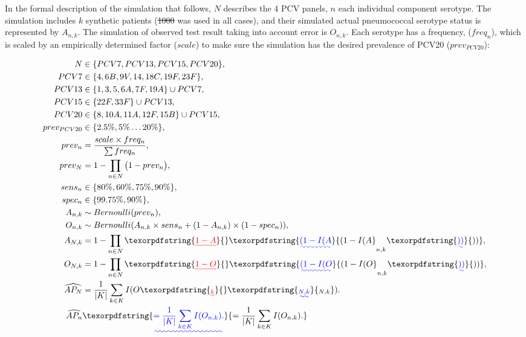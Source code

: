 \documentclass[a4paper, 12pt, twoside]{article}
\providecommand{\DIFaddtex}[1]{{\protect\color{blue}\uwave{#1}}} %
\providecommand{\DIFdeltex}[1]{{\protect\color{red}\sout{#1}}}                      %
\providecommand{\DIFaddbegin}{} %
\providecommand{\DIFaddend}{} %
\providecommand{\DIFdelbegin}{} %
\providecommand{\DIFdelend}{} %
\providecommand{\DIFadd}[1]{\texorpdfstring{\DIFaddtex{#1}}{#1}} %
\providecommand{\DIFdel}[1]{\texorpdfstring{\DIFdeltex{#1}}{}} %
\begin{document}
In the formal description of the simulation that follows, \(N\) describes the 4 PCV panels, \(n\) each individual component serotype. The simulation includes \DIFdelbegin \DIFdel{\(k\) }\DIFdelend \DIFaddbegin \DIFadd{a set of \(K\) }\DIFaddend synthetic patients (\DIFdelbegin \DIFdel{1000 }\DIFdelend \DIFaddbegin \DIFadd{4000 }\DIFaddend was used in all cases\DIFaddbegin \DIFadd{, indexed by \(k\)}\DIFaddend ), and their simulated actual pneumococcal serotype status is represented by \(A_{n,k}\). The simulation of observed test result taking into account error is \(O_{n,k}\). Each serotype has a frequency, (\(freq_n\)), which is scaled by an empirically determined factor (\(scale\)) to make sure the simulation has the desired prevalence of PCV20 (\(prev_{PCV20}\)):

\begin{equation*}
\begin{aligned}
N &\in \{PCV7, PCV13, PCV15, PCV20\}, \\
PCV7 &\in \{4, 6B, 9V, 14, 18C, 19F, 23F\}, \\
PCV13 &\in \{1, 3, 5, 6A, 7F, 19A\} \cup PCV7, \\
PCV15 &\in \{22F, 33F\} \cup PCV13,\\
PCV20 &\in \{8, 10A, 11A, 12F, 15B\} \cup PCV15,\\
prev_{PCV20} &\in \{2.5\%, 5\% \dots 20\% \},  \\
prev_n &= \frac{scale \times freq_n}{\sum{freq_n}}, \\
prev_N &= 1-\prod_{n \in N}{\DIFaddbegin \big(\DIFaddend 1-prev_n}\DIFaddbegin \big)\DIFaddend , \\
sens_n &\in \{80\%, 60\%, 75\%, 90\% \},  \\
spec_n &\in \{99.75\%,90\% \}, \\
A_{n,k} &\sim Bernoulli(prev_n), \\
O_{n,k} &\sim Bernoulli(A_{n,k} \times sens_n + (1-A_{n,k}) \times (1-spec_n)), \\
A_{N,k} &= 1-\prod_{n \in N}{\DIFdelbegin \DIFdel{1-A}\DIFdelend \DIFaddbegin \DIFadd{(1-I(A}\DIFaddend _{n,k}\DIFaddbegin \DIFadd{))}\DIFaddend }, \\
O_{N,k} &= 1-\prod_{n \in N}{\DIFdelbegin \DIFdel{1-O}\DIFdelend \DIFaddbegin \DIFadd{(1-I(O}\DIFaddend _{n,k}\DIFaddbegin \DIFadd{))}\DIFaddend }, \\
\DIFdelbegin %
\DIFdelend \DIFaddbegin \widehat{AP_N} \DIFaddend &= \frac{1}{|K|}\sum_{k \in K}{I(O\DIFdelbegin \DIFdel{_{k}}\DIFdelend \DIFaddbegin \DIFadd{_{N,k}}\DIFaddend )}. \\
\DIFaddbegin \widehat{AP_n} &\DIFadd{= \frac{1}{|K|}\sum_{k \in K}{I(O_{n,k})}. }\\
\DIFaddend \end{aligned}
\end{equation*}
\end{document}
